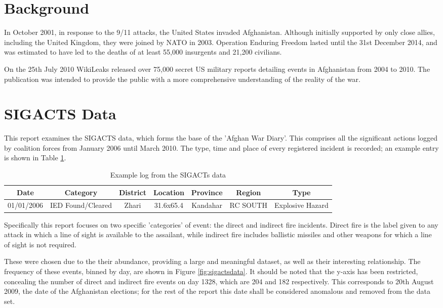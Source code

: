 \documentclass[a4paper,11pt]{report}
\begin{document}
\section{Background}

In October 2001, in response to the 9/11 attacks, the United States invaded Afghanistan. Although initially supported by only close allies, including the United Kingdom, they were joined by NATO in 2003. Operation Enduring Freedom lasted until the 31st December 2014, and was estimated to have led to the deaths of at least 55,000 insurgents and 21,200 civilians.\cite{bodycount}

On the 25th July 2010 WikiLeaks released over 75,000 secret US military reports detailing events in Afghanistan from 2004 to 2010. \cite{wikileaks} The publication was intended to provide the public with a more comprehensive understanding of the reality of the war.

\section{SIGACTS Data}
This report examines the SIGACTS data, which forms the base of the 'Afghan War Diary'. This comprises all the significant actions logged by coalition forces from January 2006 until March 2010. The type, time and place of every registered incident is recorded; an example entry is shown in Table \ref{tab:sigactseg}. 

\begin{table}[]
\centering
\caption{Example log from the SIGACTs data}
\label{tab:sigactseg}
\begin{tabular}{|c|c|c|c|c|c|c|}
\hline
\bf{Date} & \bf{Category} & \bf{District} & \bf{Location} &  \bf{Province} & \bf{Region} & \bf{Type} \\ \hline
01/01/2006 & IED Found/Cleared & Zhari & 31.6x65.4 & Kandahar & RC SOUTH & Explosive Hazard \\ \hline
\end{tabular}
\end{table}

Specifically this report focuses on two specific 'categories' of event: the direct and indirect fire incidents. Direct fire is the label given to any attack in which a line of sight is available to the assailant, while indirect fire includes ballistic missiles and other weapons for which a line of sight is not required.

These were chosen due to the their abundance, providing a large and meaningful dataset, as well as their interesting relationship. The frequency of these events, binned by day, are shown in Figure \ref{fig:sigactsdata}. It should be noted that the y-axis has been restricted, concealing the number of direct and indirect fire events on day 1328, which are 204 and 182 respectively. This corresponds to 20th August 2009, the date of the Afghanistan elections; for the rest of the report this date shall be considered anomalous and removed from the data set.
\end{document}
